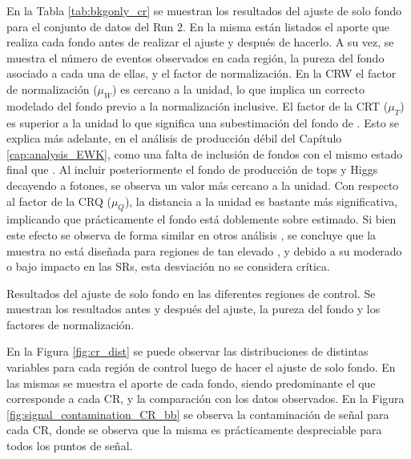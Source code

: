 En la Tabla \ref{tab:bkgonly_cr} se muestran los resultados del ajuste de solo fondo para el conjunto de datos del Run 2. En la misma están listados el aporte que realiza cada fondo antes de realizar el ajuste y después de hacerlo. A su vez, se muestra el número de eventos observados en cada región, la pureza del fondo asociado a cada una de ellas, y el factor de normalización. 
En la CRW el factor de normalización ($\mu_W$) es cercano a la unidad, lo que implica un correcto modelado del fondo previo a la normalización inclusive. El factor de la CRT ($\mu_T$) es superior a la unidad lo que significa una subestimación del fondo de \ttbarph. Esto se explica más adelante, en el análisis de producción débil del Capítulo \ref{cap:analysis_EWK}, como una falta de inclusión de fondos con el mismo estado final que \ttbarph. Al incluir posteriormente el fondo de producción de tops y Higgs decayendo a fotones, se observa un valor más cercano a la unidad. Con respecto al factor de la CRQ ($\mu_Q$), la distancia a la unidad es bastante más significativa, implicando que prácticamente el fondo está doblemente sobre estimado. Si bien este efecto se observa de forma similar en otros análisis \cite{Alonso:2689095}, se concluye que la muestra no está diseñada para regiones de tan elevado \met, y debido a su moderado o bajo impacto en las SRs, esta desviación no se considera crítica. 

\begin{table}[!ht]
  \centering
  \caption{Resultados del ajuste de solo fondo en las diferentes regiones de control. Se muestran los resultados antes y después del ajuste, la pureza del fondo y los factores de normalización.}
  
  \label{tab:bkgonly_cr}
\end{table}

En la Figura \ref{fig:cr_dist} se puede observar las distribuciones de distintas variables para cada región de control luego de hacer el ajuste de solo fondo. En las mismas se muestra el aporte de cada fondo, siendo predominante el que corresponde a cada CR, y la comparación con los datos observados. En la Figura \ref{fig:signal_contamination_CR_bb} se observa la contaminación de señal para cada CR, donde se observa que la misma es prácticamente despreciable para todos los puntos de señal.



